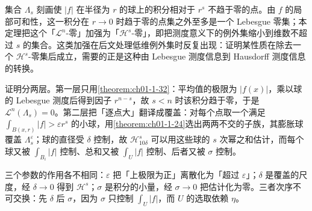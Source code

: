 \documentclass[../../main.tex]{subfiles}%
\begin{document}
\begin{remark}\label{remark:ch02-thm-2-10-动机}
集合 $\Lambda_s$ 刻画使 $\lvert f\rvert$ 在半径为 $r$ 的球上的积分相对于 $r^s$ 不趋于零的点。由 $f$ 的局部可和性，这一积分在 $r\to0$ 时趋于零的点集之外至多是一个 Lebesgue 零集；本定理把这个「$\mathcal{L}^n$-零」加强为「$\mathcal{H}^s$-零」，即把测度意义下的例外集缩小到维数不超过 $s$ 的集合。这类加强在后文处理低维例外集时反复出现：证明某性质在除去一个 $\mathcal{H}^s$-零集后成立，需要的正是这种由 Lebesgue 测度信息到 Hausdorff 测度信息的转换。

证明分两层。第一层只用\cref{theorem:ch01-1-32}：平均值的极限为 $\lvert f(x)\rvert$，乘以球的 Lebesgue 测度后得到因子 $r^{n-s}$，故 $s<n$ 时该积分趋于零，于是 $\mathcal{L}^n(\Lambda_s)=0$。第二层把「逐点大」翻译成覆盖：对每个点取一个满足 $\int_{B(x,r)}\lvert f\rvert>\varepsilon r^s$ 的小球，用\cref{theorem:ch01-1-24}选出两两不交的子族，其膨胀球覆盖 $\Lambda_s^\varepsilon$；球的直径受 $\delta$ 控制，故 $\mathcal{H}^s_{10\delta}$ 可以用这些球的 $s$ 次幂之和估计，而每个球又被 $\int_{B_i}\lvert f\rvert$ 控制、总和又被 $\int_U\lvert f\rvert$ 控制、后者又被 $\sigma$ 控制。%

三个参数的作用各不相同：$\varepsilon$ 把「上极限为正」离散化为「超过 $\varepsilon$」；$\delta$ 是覆盖的尺度，经 $\delta\to0$ 得到 $\mathcal{H}^s$；$\sigma$ 是积分的小量，经 $\sigma\to0$ 把估计化为零。三者次序不可交换：先 $\delta$ 后 $\sigma$，因为 $\sigma$ 只控制 $\int_U\lvert f\rvert$，而 $U$ 的选取依赖 $\eta$。
\end{remark}
\end{document}
